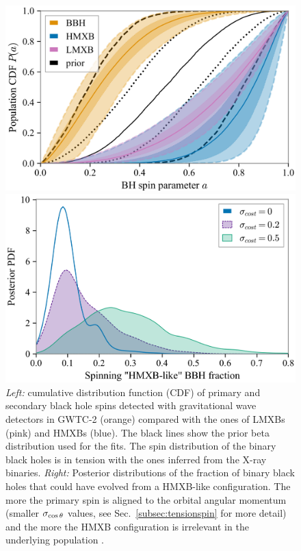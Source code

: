 \documentclass[a4paper,titlepage]{book}     	%
\begin{document}
\begin{figure}
	\begin{minipage}{.49\textwidth}
		\centering
		\includegraphics[width=\textwidth]{./images/tensionspin.png}
	\end{minipage}
	\hfill
	\begin{minipage}{.49\textwidth}
		\vspace{.5mm}
		\centering
		\includegraphics[width=\textwidth]{./images/tensionspinHMXBHlike.png}	
	\end{minipage}
	\caption{\emph{Left:} cumulative distribution function (CDF) of primary and secondary black hole spins detected with gravitational wave detectors in GWTC-2 (orange) compared with the ones of LMXBs (pink) and HMXBs (blue). The black lines show the prior beta distribution used for the fits. The spin distribution of the binary black holes is in tension with the ones inferred from the X-ray binaries. \emph{Right:} Posterior distributions of the fraction of binary black holes that could have evolved from a HMXB-like configuration. The more the primary spin is aligned to the orbital angular momentum (smaller $\sigma_{\rm \cos \theta}$ values, see Sec.\ \ref{subsec:tensionspin} for more detail) and the more the HMXB configuration is irrelevant in the underlying population \cite{HMXBH_spins2021}.}\label{fig:tensionspin}
\end{figure}
\end{document}
